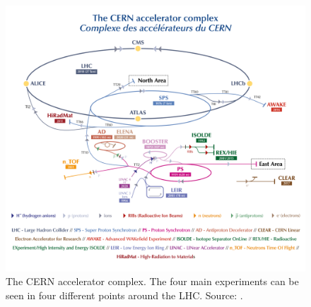 \begin{figure}[!ht]
    \vspace*{-0.0cm}
    \centering
    \setlength{\mylength}{\textwidth}
    \includegraphics[width=0.84\mylength]{resources/LHC.png}
    \vspace*{-0.0cm}
    \caption{The CERN accelerator complex. The four main experiments can be seen in four different points around the LHC. Source: \cite{Mobs:2684277}.}
    \label{fig:CERN_LHC}
    \vspace*{-0.3cm}
\end{figure}

